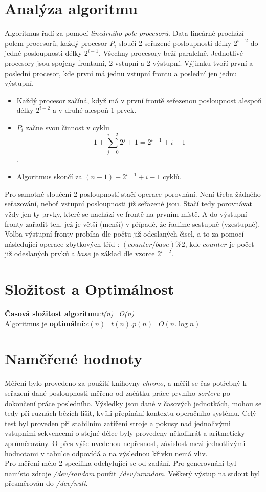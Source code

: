 \documentclass[a4paper, 10pt]{article}[5.10.2011]
\begin{document}
\section{Analýza algoritmu}
Algoritmus řadí za pomocí \textit{lineárního pole procesorů}. Data lineárně prochází polem procesorů, každý procesor $P_{i}$ sloučí 2 seřazené posloupnosti délky $2^{i-2}$ do jedné posloupnosti délky $2^{i-1}$. Všechny procesory beží paralelně. Jednotlivé procesory jsou spojeny frontami, 2 vstupní a 2 výstupní. Výjimku tvoří první a poslední procesor, kde první má jednu vstupní frontu a poslední jen jednu výstupní. 
\begin{itemize}
\item Každý procesor začíná, když má v první frontě seřezenou posloupnost alespoň délky $2^{i-2}$ a v druhé alespoň 1 prvek.
\item $P_{i}$ začne svou činnost v cyklu $$1 + \sum^{i-2}_{j=0} 2^j + 1 = 2^{i-1} + i -1$$.
\item Algoritmus skončí za $(n-1) + 2^{i-1} + i - 1$ cyklů. 
\end{itemize}

	Pro samotné sloučení 2 posloupností stačí operace porovnání. Není třeba žádného seřazování, neboť vstupní posloupnosti již seřazené jsou. Stačí tedy porovnávat vždy jen ty prvky, které se nachází ve frontě na prvním místě. A do výstupní fronty zařadit ten, jež je větší (menší) v případě, že řadíme sestupně (vzestupně). Volba výstupní fronty probíha dle počtu již odeslaných čisel, a to za pomocí následující operace zbytkových tříd : $(counter / base) \% 2$, kde $counter$ je počet již odeslaných prvků a $base$ je základ dle vzorce $2^{i-2}$.

\section{Složitost a Optimálnost}
\textbf{Časová složitost algoritmu}:\textit{t(n)=O(n)}\\
Algoritmus je \textbf{optimální}:\textit{$c(n)$}=\textit{$t(n)$}$.$\textit{$p(n)$}=\textit{$O(n.\log n)$}

\section{Naměřené hodnoty}
Měření bylo provedeno za použití knihovny \textit{chrono}, a měřil se čas potřebný k seřazení dané posloupnosti měřeno od začátku práce prvního \textit{sorteru} po dokončení práce posledního. Výsledky jsou dané v časových jednotkách, mohou se tedy při ruznách bězích lišit, kvůli přepínání kontextu operačního systému. Celý test byl proveden při stabilním zatížení stroje a pokusy nad jednolivými vstupními sekvencemi o stejné délce byly provedeny několikrát a aritmeticky zprůměrovány. O přes výše uvedenou nepřesnost, závislost mezi jednotlivými hodnotami v tabulce odpovídá a na výslednou křivku nemá vliv. \\
Pro měření mělo 2 specifika odchylující se od zadání. Pro generovnání byl namísto zdroje \textit{/dev/random} použit \textit{/dev/urandom}. Veškerý výstup na stdout byl přesměrován do \textit{/dev/null}.
\end{document}
